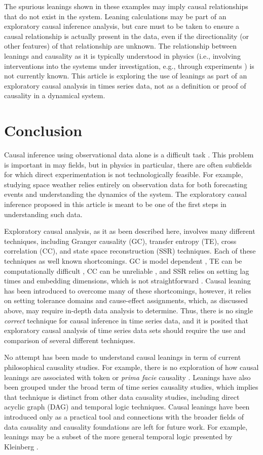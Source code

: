 \documentclass[a4paper,11pt,twocolumn]{article}
\begin{document}
The spurious leanings shown in these examples may imply causal relationships that do not exist in the system.  Leaning calculations may be part of an exploratory causal inference analysis, but care must to be taken to ensure a causal relationship is actually present in the data, even if the directionality (or other features) of that relationship are unknown.  The relationship between leanings and causality as it is typically understood in physics (i.e., involving interventions into the systems under investigation, e.g., through experiments \cite{Pearl}) is not currently known.  This article is exploring the use of leanings as part of an exploratory causal analysis in times series data, not as a definition or proof of causality in a dynamical system.   

\section{Conclusion}
Causal inference using observational data alone is a difficult task \cite{}.  This problem is important in may fields, but in physics in particular, there are often subfields for which direct experimentation is not technologically feasible.  For example, studying space weather relies entirely on observation data for both forecasting events and understanding the dynamics of the system.  The exploratory causal inference proposed in this article is meant to be one of the first steps in understanding such data.  

Exploratory causal analysis, as it as been described here, involves many different techniques, including Granger causality (GC), transfer entropy (TE), cross correlation (CC), and state space reconstruction (SSR) techniques.  Each of these techniques as well known shortcomings.  GC is model dependent \cite{}, TE can be computationally difficult \cite{}, CC can be unreliable \cite{}, and SSR relies on setting lag times and embedding dimensions, which is not straightforward \cite{}.  Causal leaning has been introduced to overcome many of these shortcomings, however, it relies on setting tolerance domains and cause-effect assignments, which, as discussed above, may require in-depth data analysis to determine.  Thus, there is no single {\em correct} technique for causal inference in time series data, and it is posited that exploratory causal analysis of time series data sets should require the use and comparison of several different techniques.

No attempt has been made to understand causal leanings in term of current philosophical causality studies.   For example, there is no exploration of how causal leanings are associated with token or {\em prima facie} causality \cite{}.  Leanings have also been grouped under the broad term of time series causality studies, which implies that technique is distinct from other data causality studies, including direct acyclic graph (DAG) \cite{Pearl} and temporal logic \cite{Klienberg} techniques.  Causal leanings have been introduced only as a practical tool and connections with the broader fields of data causality and causality foundations are left for future work.  For example, leanings may be a subset of the more general temporal logic presented by Kleinberg \cite{}.
\end{document}

